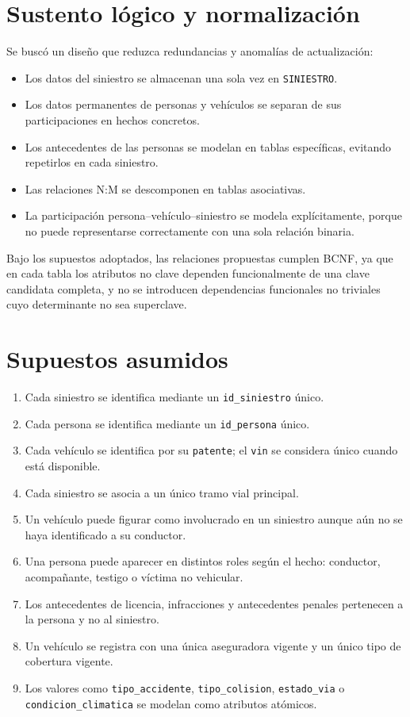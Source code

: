 \documentclass[12pt,a4paper]{article}
\begin{document}
\section{Sustento lógico y normalización}

Se buscó un diseño que reduzca redundancias y anomalías de actualización:

\begin{itemize}[leftmargin=*]
    \item Los datos del siniestro se almacenan una sola vez en \texttt{SINIESTRO}.
    \item Los datos permanentes de personas y vehículos se separan de sus participaciones en hechos concretos.
    \item Los antecedentes de las personas se modelan en tablas específicas, evitando repetirlos en cada siniestro.
    \item Las relaciones N:M se descomponen en tablas asociativas.
    \item La participación persona--vehículo--siniestro se modela explícitamente, porque no puede representarse correctamente con una sola relación binaria.
\end{itemize}

Bajo los supuestos adoptados, las relaciones propuestas cumplen BCNF, ya que en cada tabla los atributos no clave dependen funcionalmente de una clave candidata completa, y no se introducen dependencias funcionales no triviales cuyo determinante no sea superclave.

\section{Supuestos asumidos}

\begin{enumerate}[leftmargin=*]
    \item Cada siniestro se identifica mediante un \texttt{id\_siniestro} único.
    \item Cada persona se identifica mediante un \texttt{id\_persona} único.
    \item Cada vehículo se identifica por su \texttt{patente}; el \texttt{vin} se considera único cuando está disponible.
    \item Cada siniestro se asocia a un único tramo vial principal.
    \item Un vehículo puede figurar como involucrado en un siniestro aunque aún no se haya identificado a su conductor.
    \item Una persona puede aparecer en distintos roles según el hecho: conductor, acompañante, testigo o víctima no vehicular.
    \item Los antecedentes de licencia, infracciones y antecedentes penales pertenecen a la persona y no al siniestro.
    \item Un vehículo se registra con una única aseguradora vigente y un único tipo de cobertura vigente.
    \item Los valores como \texttt{tipo\_accidente}, \texttt{tipo\_colision}, \texttt{estado\_via} o \texttt{condicion\_climatica} se modelan como atributos atómicos.
\end{enumerate}
\end{document}
